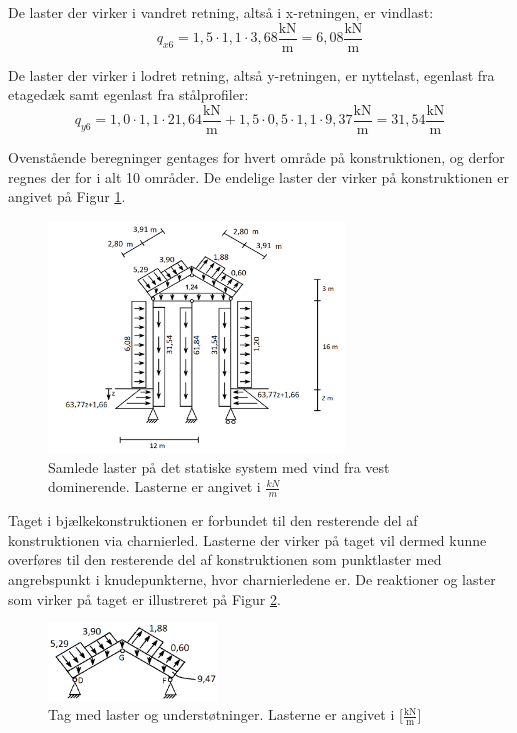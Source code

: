 De laster der virker i vandret retning, altså i x-retningen, er vindlast:
\begin{equation}
	q_{x6} = 1,\!5 \cdot 1,\!1 \cdot 3,\!68 \frac{\text{kN}}{\text{m}} = 6,\!08 \frac{\text{kN}}{\text{m}}
\end{equation}

De laster der virker i lodret retning, altså y-retningen, er nyttelast, egenlast fra etagedæk samt egenlast fra stålprofiler:
\begin{equation}
	q_{y6} = 1,\!0 \cdot 1,\!1 \cdot 21,\!64 \frac{\text{kN}}{\text{m}} + 1,\!5 \cdot 0,\!5 \cdot 1,\!1 \cdot 9,\!37 \frac{\text{kN}}{\text{m}} = 31,\!54 \frac{\text{kN}}{\text{m}}
\end{equation}

Ovenstående beregninger gentages for hvert område på konstruktionen, og derfor regnes der for i alt 10 områder. De endelige laster der virker på konstruktionen er angivet på Figur \ref{fig:laster}. 

\begin{figure}[htbp]
	\centering
	\includegraphics[width=0.7\textwidth]{billeder/vdom.png}
	\caption{Samlede laster på det statiske system med vind fra vest dominerende. Lasterne er angivet i $\frac{kN}{m}$}
	\label{fig:laster}
\end{figure}

Taget i bjælkekonstruktionen er forbundet til den resterende del af konstruktionen via charnierled. Lasterne der virker på taget vil dermed kunne overføres til den resterende del af konstruktionen som punktlaster med angrebspunkt i knudepunkterne, hvor charnierledene er. De reaktioner og laster som virker på taget er illustreret på Figur \ref{fig:tagmedreaktioner}.

\begin{figure}[htbp]
	\centering
	\includegraphics[width=0.4\textwidth]{billeder/tagmedreaktioner.png}
	\caption{Tag med laster og understøtninger. Lasterne er angivet i [$\frac{\text{kN}}{\text{m}}$]}
	\label{fig:tagmedreaktioner}
\end{figure}

